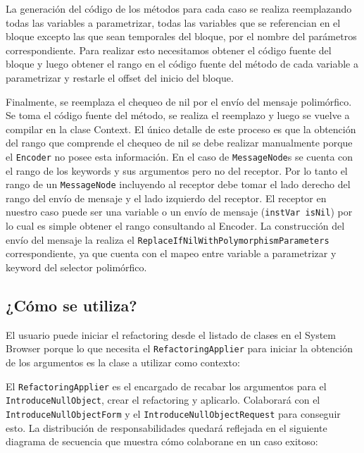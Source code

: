La generación del código de los métodos para cada caso se realiza reemplazando todas las variables
a parametrizar, todas las variables que se referencian en el bloque excepto las que sean temporales
del bloque, por el nombre del parámetros correspondiente. Para realizar esto necesitamos obtener el 
código fuente del bloque y luego obtener el rango en el código fuente del método de cada variable a
parametrizar y restarle el offset del inicio del bloque.

Finalmente, se reemplaza el chequeo de nil por el envío del mensaje polimórfico. Se toma el código
fuente del método, se realiza el reemplazo y luego se vuelve a compilar en la clase Context. El
único detalle de este proceso es que la obtención del rango que comprende el chequeo de nil se debe
realizar manualmente porque el \lstinline{Encoder} no posee esta información. En el caso de
\lstinline{MessageNode}s se cuenta con el rango de los keywords y sus argumentos pero no del
receptor. Por lo tanto el rango de un \lstinline{MessageNode} incluyendo al receptor debe tomar el
lado derecho del rango del envío de mensaje y el lado izquierdo del receptor. El receptor en nuestro
caso puede ser una variable o un envío de mensaje (\lstinline{instVar isNil}) por lo cual es simple
obtener el rango consultando al Encoder. La construcción del envío del mensaje la realiza el
\lstinline{ReplaceIfNilWithPolymorphismParameters} correspondiente, ya que cuenta con el mapeo entre
variable a parametrizar y keyword del selector polimórfico. 


\subsection{¿Cómo se utiliza?}

El usuario puede iniciar el refactoring desde el listado de clases en el System Browser porque lo que
necesita el \lstinline{RefactoringApplier} para iniciar la obtención de los argumentos es la clase
a utilizar como contexto:


El \lstinline{RefactoringApplier} es el encargado de recabar los argumentos para el
\lstinline{IntroduceNullObject}, crear el refactoring y aplicarlo. Colaborará con el
\lstinline{IntroduceNullObjectForm} y el \lstinline{IntroduceNullObjectRequest} para conseguir esto.
La distribución de responsabilidades quedará reflejada en el siguiente diagrama de secuencia
que muestra cómo colaborane en un caso exitoso:

